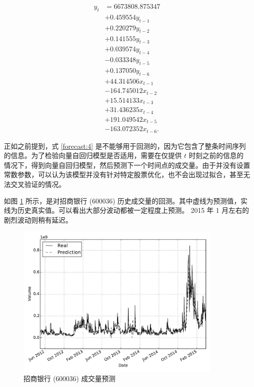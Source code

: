 \begin{equation}
  \label{forecast:4}
  \begin{split}
    y_{t}&=6673808.875347 \\
    &+0.459554y_{t-1} \\
    &+0.220279y_{t-2} \\
    &+0.141555y_{t-3} \\
    &+0.039574y_{t-4} \\
    &-0.033348y_{t-5} \\
    &+0.137050y_{t-6} \\
    &+44.314506x_{t-1} \\
    &-164.745012x_{t-2} \\
    &+15.514133x_{t-3} \\
    &+31.436235x_{t-4} \\
    &+191.049542x_{t-5} \\
    &-163.072352x_{t-6}.
  \end{split}
\end{equation}

正如之前提到，式 \ref{forecast:4} 是不能够用于回测的，因为它包含了整条时间序列的信息。为了检验向量自回归模型是否适用，需要在仅提供 $t$ 时刻之前的信息的情况下，得到向量自回归模型，然后预测下一个时间点的成交量。由于并没有设置常数参数，可以认为该模型并没有针对特定股票优化，也不会出现过拟合，甚至无法交叉验证的情况。

如图 \ref{forecast:5} 所示，是对招商银行 (600036) 历史成交量的回测。其中虚线为预测值，实线为历史真实值。可以看出大部分波动都被一定程度上预测。 2015 年 1 月左右的剧烈波动则稍有延迟。

\begin{figure}
  \centering
  \includegraphics[width=0.9\textwidth]{plots/var_forecast_regression_line.pdf}
  \caption{招商银行 (600036) 成交量预测}
  \label{forecast:5}
\end{figure}

